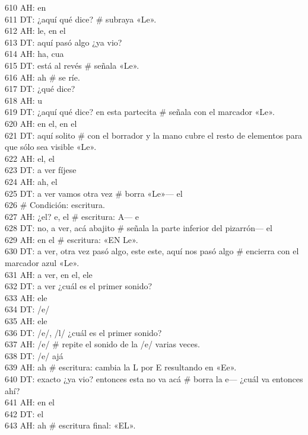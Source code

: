 610 AH: en\\
611 DT: ¿aquí qué dice? \# subraya «Le».\\
612 AH: le, en el\\
613 DT: aquí pasó algo ¿ya vio?\\
614 AH: ha, cua\\
615 DT: está al revés \# señala «Le».\\
616 AH: ah \# se ríe.\\
617 DT: ¿qué dice?\\
618 AH: u\\
619 DT: ¿aquí qué dice? en esta partecita \# señala con el marcador «Le».\\
620 AH: en el, en el\\
621 DT: aquí solito \# con el borrador y la mano cubre el resto de elementos para que sólo sea visible «Le».\\
622 AH: el, el\\
623 DT: a ver fíjese\\
624 AH: ah, el\\
625 DT: a ver vamos otra vez \# borra «Le»--- el\\
626 \# Condición: escritura.\\
627 AH: ¿el? e, el \# escritura: A--- e\\
628 DT: no, a ver, acá abajito \# señala la parte inferior del pizarrón--- el\\
629 AH: en el \# escritura: «EN Le».\\
630 DT: a ver, otra vez pasó algo, este este, aquí nos pasó algo \# encierra con el marcador azul «Le».\\
631 AH: a ver, en el, ele\\
632 DT: a ver ¿cuál es el primer sonido?\\
633 AH: ele\\
634 DT: /e/\\
635 AH: ele\\
636 DT: /e/, /l/ ¿cuál es el primer sonido?\\
637 AH: /e/ \# repite el sonido de la /e/ varias veces.\\
638 DT: /e/ ajá\\
639 AH: ah \# escritura: cambia la L por E resultando en «Ee».\\
640 DT: exacto ¿ya vio? entonces esta no va acá \# borra la e--- ¿cuál va entonces ahí?\\
641 AH: en el\\
642 DT: el\\
643 AH: ah \# escritura final: «EL».\\
